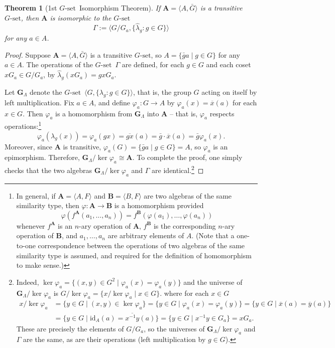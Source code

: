 \documentclass[cm,dissertation]{uhthesis}
\theoremstyle{plain}
\newtheorem{theorem}{Theorem}[section]
\theoremstyle{definition}
\theoremstyle{remark}
\numberwithin{theorem}{section}
\numberwithin{claim}{chapter}
\numberwithin{equation}{section}
\numberwithin{conjecture}{chapter}
\newcommand{\<}{\ensuremath{\langle}}
\renewcommand{\>}{\ensuremath{\rangle}}
\newcommand{\0}{\ensuremath{\mathbf{0}}}
\newcommand{\1}{\ensuremath{\mathbf{1}}}
\newcommand{\2}{\ensuremath{\mathbf{2}}}
\newcommand{\3}{\ensuremath{\mathbf{3}}}
\newcommand{\4}{\ensuremath{\mathbf{4}}}
\newcommand{\5}{\ensuremath{\mathbf{5}}}
\newcommand{\bA}{\ensuremath{\mathbf{A}}}
\newcommand{\bB}{\ensuremath{\mathbf{B}}}
\newcommand{\bG}{\ensuremath{\mathbf{G}}}
\newcommand{\barG}{\ensuremath{\bar{G}}}
\newcommand{\barg}{\ensuremath{\bar{g}}}
\newcommand{\barx}{\ensuremath{\overline{x}}}
\newcommand{\bary}{\ensuremath{\overline{y}}}
\newcommand{\stab}[1]{\ensuremath{G_{#1}}}
\newcommand{\Gset}{\ensuremath{G\text{-set}}}
\newcommand{\id}{\ensuremath{\mathrm{id}}}
\begin{document}
\begin{theorem}[1st \Gset\ Isomorphism Theorem]
\label{thm:g-set-isomorphism1}
  If $\bA = \<A, \barG\>$ is a transitive \Gset, then $\bA$ is
  isomorphic to the \Gset 
  \[
  \Gamma :=  \<G/\stab{a}, \{\hat{\lambda}_g : g\in G\}\>
  \]
  for any $a\in A$.
\end{theorem}
\begin{proof}
  Suppose $\bA= \<A, \barG\>$ is a transitive \Gset, so 
  $A = \{\barg a \mid  g\in G\}$ for any $a\in A$.  The operations of the \Gset\ $\Gamma$ are defined, for each $g\in G$ and each
  coset $x \stab{a}\in G/\stab{a}$, by $\hat{\lambda}_g(x \stab{a}) = gx\stab{a}$. 

  Let 
  $\bG_\Lambda$ denote the \Gset\ $\<G, \{\lambda_g : g\in G\}\>$, that is,
  the group $G$ acting on itself by left multiplication. 
  Fix $a\in A$, and define $\varphi_a:G \rightarrow A$ by $\varphi_a(x) =
  \barx(a)$ for 
  each $x\in G$.  
  Then $\varphi_a$ is a homomorphism
  from 
  $\bG_\Lambda$ 
  into $\bA$ --
  that is, $\varphi_a$ respects operations:\footnote{In general, if $\bA
    =\< A, F\>$ and $\bB = \<B, F\>$ are two algebras of the same
    similarity type, then   
    $\varphi: \bA \rightarrow \bB$ is a homomorphism provided
    \[
    \varphi(f^\bA(a_1,\dots, a_n)) = f^\bB(\varphi(a_1),\dots,\varphi(a_n))
    \]
    whenever $f^\bA$ is an $n$-ary operation of $\bA$, $f^\bB$ is the
    corresponding $n$-ary operation of $\bB$, and $a_1,\dots, a_n$ are arbitrary 
    elements of $A$.  (Note that a one-to-one correspondence between the
    operations of 
    two algebras of the same similarity type is assumed, and required for the
    definition 
    of homomorphism to make sense.)
  }
  \[
  \varphi_a(\lambda_g(x)) = \varphi_a(gx)= \overline{gx}(a)
  = \barg \cdot \barx(a)
  = \barg \varphi_a(x).
  \]
  Moreover, since $\bA$ is transitive, $\varphi_a(G) = \{\barg a \mid  g\in G\}
  = A$, 
  so $\varphi_a$ is an epimorphism.  Therefore,
  $\bG_\Lambda/\ker \varphi_a \cong \bA$.  
  To complete the proof, one simply checks that the two algebras $\bG_\Lambda
  /\ker \varphi_a $ and $\Gamma$ are identical.\footnote{
    Indeed, 
    $\ker \varphi_a = \{(x,y) \in G^2 \mid  \varphi_a(x) = \varphi_a(y)\}$
    and the  universe of $\bG_\Lambda /\ker \varphi_a$ is 
    $G/\ker \varphi_a = \{x/\ker \varphi_a  \mid x\in G \}$. 
     where for each $x\in G$
  \begin{align*}
    x/\ker \varphi_a &= \{y\in G  \mid  (x,y) \in \ker \varphi_a\}
    = \{y\in G  \mid  \varphi_a(x) = \varphi_a(y)\}
    = \{y\in G  \mid  \barx(a) = \bary(a)\}\\
    &= \{y\in G  \mid  \id_{A}(a) = \overline{x^{-1}y}(a)\}
    = \{y\in G  \mid  x^{-1}y \in \stab{a}\}
    = x \stab{a}.
  \end{align*}
  These are precisely the elements of $G/\stab{a}$,
  so the universes of $\bG_\Lambda /\ker \varphi_a$ and $\Gamma$ are
  the same, as are their operations (left multiplication by $g\in G$).}
\end{proof}
\end{document}

